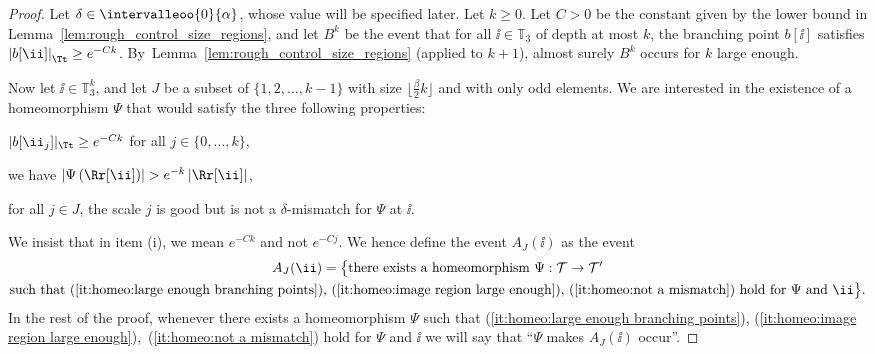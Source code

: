 \begin{proof}
Let $\delta \in \intervalleoo{0}{\alpha}$, whose value will be specified later.
Let $k \geq 0$.
Let $C>0$ be the constant given by the lower bound in Lemma~\ref{lem:rough_control_size_regions}, and let $B^k$ be the event that for all $\ii \in \mathbb{T}_3$ of depth at most $k$, the branching point $b[\ii]$ satisfies $\left| b[\ii] \right|_{\Tt} \geq e^{-Ck}$.
By~Lemma~\ref{lem:rough_control_size_regions} (applied to $k+1$), almost surely $B^k$ occurs for $k$ large enough.

Now let $\ii \in \mathbb{T}_3^k$, and let $J$ be a subset of $\{ 1,2,\dots, k-1\}$ with size $\lfloor \frac{\beta}{2} k \rfloor$ and with only odd elements.
We are interested in the existence of a homeomorphism $\Psi$ that would satisfy the three following properties:
\begin{enumeratei}
\item\label{it:homeo:large enough branching points} $| b[\ii_j]|_{\Tt} \geq e^{-C k}$ for all $j\in\{0,\dots,k\}$,
\item\label{it:homeo:image region large enough} we have $\left| \Psi \left( \Rr[\ii] \right) \right| > e^{-k} \left| \Rr[\ii] \right|$,
\item\label{it:homeo:not a mismatch} for all $j \in J$, the scale $j$ is good but is not a $\delta$-mismatch for $\Psi$ at $\ii$.
\end{enumeratei}
We insist that in item (i), we mean $e^{-Ck}$ and not $e^{-Cj}$. We hence define the event $A_J(\ii)$ as the event
\begin{multline*}
A_J(\ii) = \big\{ \mbox{there exists a homeomorphism $\Psi:\mathcal{T} \to \mathcal{T}'$} \\ \mbox{such that (\ref{it:homeo:large enough branching points}), (\ref{it:homeo:image region large enough}), (\ref{it:homeo:not a mismatch}) hold for $\Psi$ and $\ii$}\big\}.
\end{multline*}
In the rest of the proof, whenever there exists a homeomorphism $\Psi$ such that (\ref{it:homeo:large enough branching points}), (\ref{it:homeo:image region large enough}),~(\ref{it:homeo:not a mismatch}) hold for $\Psi$ and $\ii$ we will say that ``$\Psi$ makes $A_J(\ii)$ occur''.


\end{proof}
